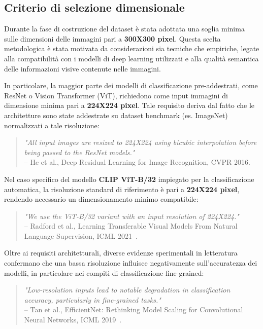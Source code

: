 \subsection*{Criterio di selezione dimensionale}
\label{sec:criterio-dimensione}

Durante la fase di costruzione del dataset è stata adottata una soglia minima sulle dimensioni delle immagini pari a \textbf{300X300 pixel}. Questa scelta metodologica è stata motivata da considerazioni sia tecniche che empiriche, legate alla compatibilità con i modelli di deep learning utilizzati e alla qualità semantica delle informazioni visive contenute nelle immagini.

In particolare, la maggior parte dei modelli di classificazione pre-addestrati, come ResNet o Vision Transformer (ViT), richiedono come input immagini di dimensione minima pari a \textbf{224X224 pixel}. Tale requisito deriva dal fatto che le architetture sono state addestrate su dataset benchmark (es. ImageNet) normalizzati a tale risoluzione:

\begin{quote}
\textit{"All input images are resized to 224X224 using bicubic interpolation before being passed to the ResNet models."} \\ 
\small -- He et al., Deep Residual Learning for Image Recognition, CVPR 2016\cite{he2016deep}.
\end{quote}

Nel caso specifico del modello \textbf{CLIP ViT-B/32} impiegato per la classificazione automatica, la risoluzione standard di riferimento è pari a \textbf{224X224 pixel}, rendendo necessario un dimensionamento minimo compatibile:

\begin{quote}
\textit{"We use the ViT-B/32 variant with an input resolution of 224X224."} \\ 
\small -- Radford et al., Learning Transferable Visual Models From Natural Language Supervision, ICML 2021~\cite{radford2021learning}.
\end{quote}

Oltre ai requisiti architetturali, diverse evidenze sperimentali in letteratura confermano che una bassa risoluzione influisce negativamente sull’accuratezza dei modelli, in particolare nei compiti di classificazione fine-grained:

\begin{quote}
\textit{"Low-resolution inputs lead to notable degradation in classification accuracy, particularly in fine-grained tasks."} \\ 
\small -- Tan et al., EfficientNet: Rethinking Model Scaling for Convolutional Neural Networks, ICML 2019~\cite{tan2019efficientnet}.
\end{quote}

